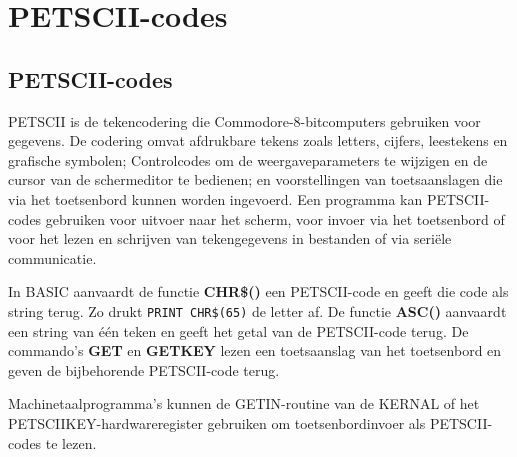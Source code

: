 \chapter{PETSCII-codes}
\label{appendix:petsciicodes}

\section{PETSCII-codes}

PETSCII is de tekencodering die Commodore-8-bitcomputers gebruiken voor gegevens. De codering omvat afdrukbare tekens zoals letters, cijfers, leestekens en grafische symbolen; Controlcodes om de weergaveparameters te wijzigen en de cursor van de schermeditor te bedienen; en voorstellingen van toetsaanslagen die via het toetsenbord kunnen worden ingevoerd. Een programma kan PETSCII-codes gebruiken voor uitvoer naar het scherm, voor invoer via het toetsenbord of voor het lezen en schrijven van tekengegevens in bestanden of via seriële communicatie.

In BASIC aanvaardt de functie \textbf{CHR\$()} een PETSCII-code en geeft die code als string terug. Zo drukt \texttt{PRINT CHR\$(65)} de letter  af. De functie \textbf{ASC()} aanvaardt een string van één teken en geeft het getal van de PETSCII-code terug. De commando's \textbf{GET} en \textbf{GETKEY} lezen een toetsaanslag van het toetsenbord en geven de bijbehorende PETSCII-code terug.

Machinetaalprogramma's kunnen de GETIN-routine van de KERNAL of het PETSCIIKEY-hardwareregister gebruiken om toetsenbordinvoer als PETSCII-codes te lezen.

